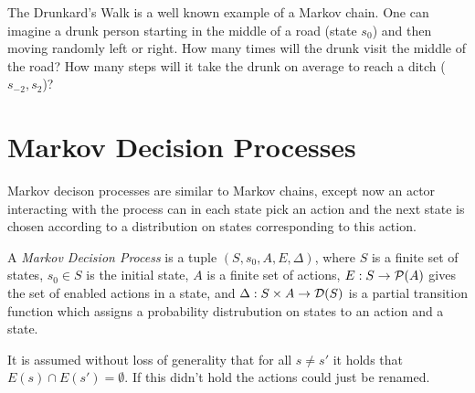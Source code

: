\begin{example} The Drunkard's Walk is a well known example of a Markov
    chain. One can imagine a drunk person starting in the middle of a road
    (state $s_0$) and then moving randomly left or right. How many times
    will the drunk visit the middle of the road? How many steps will it
    take the drunk on average to reach a ditch ($s_{-2}, s_2$)?

\hfill \break
\centering
{}
\end{example}

\section{Markov Decision Processes}

Markov decison processes are similar to Markov chains, except now an
actor interacting with the process can in each state pick an action
and the next state is chosen according to a distribution on states
corresponding to this action.

\begin{definition}
A {\em Markov Decision Process} is a tuple $(S, s_0, A, E, \Delta)$, where
$S$ is a finite set of states,
$s_0 \in S$ is the initial state,
$A$ is a finite set of actions,
$E : S \to \mathcal{P}(A)$ gives the set of enabled actions in a state,
and $\Delta : S \times A \to \mathcal{D}(S)$ is a partial transition
function which assigns a probability distrubution on states to an action
and a state.

It is assumed without loss of generality that for all $s \neq s'$ it
holds that $E(s) \cap E(s') = \emptyset$. If this didn't hold the
actions could just be renamed.
\end{definition}


